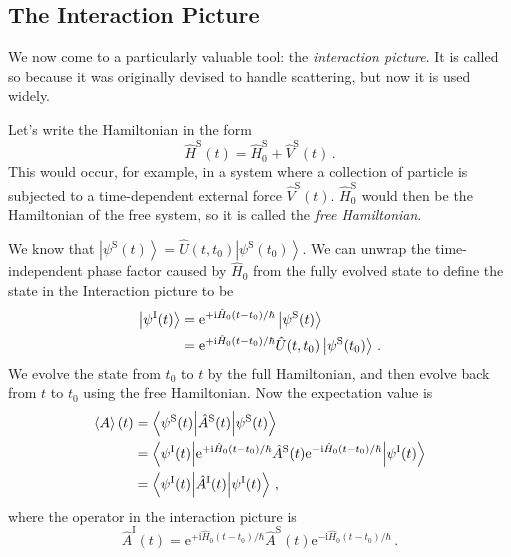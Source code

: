 \documentclass{article}
\theoremstyle{plain}\theoremheaderfont{\normalfont\itshape}\theorembodyfont{\rmfamily}\theoremseparator{.}\newtheorem*{rem}{Remark}\newtheorem*{ex}{Example}\newtheorem*{proof}{Proof}\newtheorem*{altp}{Alternative proof}
\theoremstyle{plain}\theoremheaderfont{\normalfont\bfseries}\theorembodyfont{\rmfamily}\theoremseparator{.}\newtheorem{thm}{Theorem}[section]\newtheorem{lem}[thm]{Lemma}\newtheorem{prop}[thm]{Proposition}\newtheorem*{cor}{Corollary}\newtheorem{defn}[thm]{Definition}\newtheorem{clm}[thm]{Claim}\newtheorem{clminproof}{Claim}
\theoremstyle{break}\theoremheaderfont{\normalfont\itshape}\theorembodyfont{\rmfamily}\theoremseparator{.\medskip}\newtheorem*{proofskip}{Proof}\newtheorem*{exs}{Examples}\newtheorem*{rems}{Remarks}
\theoremstyle{break}\theoremheaderfont{\normalfont\bfseries}\theorembodyfont{\rmfamily}\theoremseparator{.\medskip}\newtheorem{lemskip}[thm]{Lemma}\newtheorem{defnskip}[thm]{Definition}\newtheorem{propskip}[thm]{Proposition}\newtheorem{thmskip}[thm]{Theorem}
\numberwithin{equation}{section}
\newcommand{\ii}{\mathrm{i}}
\newcommand{\ee}{\mathrm{e}}
\newcommand{\ket}[1]{\left| #1 \right\rangle}
\newcommand{\eval}[1]{\left\langle #1 \right\rangle}
\newcommand{\expval}[2]{\left\langle #2 \middle| #1 \middle| #2 \right\rangle}
\newcommand{\Sch}{^{\mathrm{S}}}
\newcommand{\Int}{^{\mathrm{I}}}
\begin{document}
    \subsection{The Interaction Picture}\label{Chap:Interaction_Picture}
    We now come to a particularly valuable tool: the \textit{interaction picture}. It is called so because it was originally devised to handle scattering, but now it is used widely.

    Let's write the Hamiltonian in the form
    \begin{equation}\label{interaction_picture_Hamiltonian}
        \hat{H}\Sch(t)=\hat{H}_0\Sch+\hat{V}\Sch(t)\,.
    \end{equation}
    This would occur, for example, in a system where a collection of particle is subjected to a time-dependent external force \(\hat{V}\Sch(t)\). \(\hat{H}_0\Sch\) would then be the Hamiltonian of the free system, so it is called the \textit{free Hamiltonian}.

    We know that \(\ket{\psi\Sch(t)}=\hat{U}(t,t_0)\ket{\psi\Sch(t_0)}\). We can unwrap the time-independent phase factor caused by \(\hat{H}_0\) from the fully evolved state to define the state in the Interaction picture to be
    \begin{align}
        \ket{\psi\Int(t)}&=\ee^{+\ii\hat{H}_0(t-t_0)/\hbar}\ket{\psi\Sch(t)}\notag \\
        &=\ee^{+\ii\hat{H}_0(t-t_0)/\hbar}\hat{U}(t,t_0)\ket{\psi\Sch(t_0)}\,.
    \end{align}
    We evolve the state from \(t_0\) to \(t\) by the full Hamiltonian, and then evolve back from \(t\) to \(t_0\) using the free Hamiltonian. Now the expectation value is
    \begin{align}
        \eval{A}(t)&=\expval{\hat{A}\Sch(t)}{\psi\Sch(t)}\notag\\
        &=\expval{\ee^{+\ii\hat{H}_0(t-t_0)/\hbar}\hat{A}\Sch(t)\ee^{-\ii\hat{H}_0(t-t_0)/\hbar}}{\psi\Int(t)}\notag \\
        &=\expval{\hat{A}\Int(t)}{\psi\Int(t)}\,,
    \end{align}
    where the operator in the interaction picture is
    \begin{equation}
        \hat{A}\Int(t)=\ee^{+\ii\hat{H}_0(t-t_0)/\hbar}\hat{A}\Sch(t)\ee^{-\ii\hat{H}_0(t-t_0)/\hbar}\,.
    \end{equation}
\end{document}
